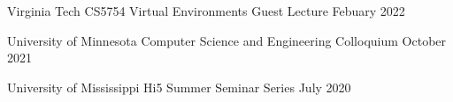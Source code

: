 
\begin{cventries}

  \cventry
    {Virginia Tech} %
    {CS5754 Virtual Environments Guest Lecture} %
    {Febuary 2022} %
    {} %
    {}
    \vspace{-0.15in}

  \cventry
    {University of Minnesota} %
    {Computer Science and Engineering Colloquium} %
    {October 2021} %
    {} %
    {}
    \vspace{-0.15in}
    
  \cventry
    {University of Mississippi} %
    {Hi5 Summer Seminar Series} %
    {July 2020} %
    {} %
    {}
    \vspace{-0.15in}
\end{cventries}
